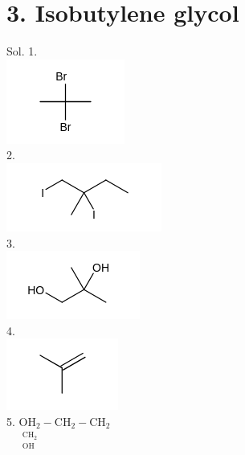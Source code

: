\documentclass[10pt]{article}
\begin{document}
\section*{3. Isobutylene glycol}
Sol. 1.\\
\includegraphics{smile-91e9bd7c4f6752a2a5abe8b37db85259d134257b}\\
2.\\
\includegraphics{smile-e64c3b33281c7596287d3427ac656ae603e7093c}\\
3.\\
\includegraphics{smile-bdf1ef205f526ad49ce693854ec9ecd664787963}\\
4.\\
\includegraphics{smile-db263b8692a384a325cc5560fce99e05fe660348}\\
5. $\underset{\substack{\mathrm{CH}_{2} \\ \mathrm{OH}}}{\mathrm{OH}_{2}}-\mathrm{CH}_{2}-\mathrm{CH}_{2}$
\end{document}
